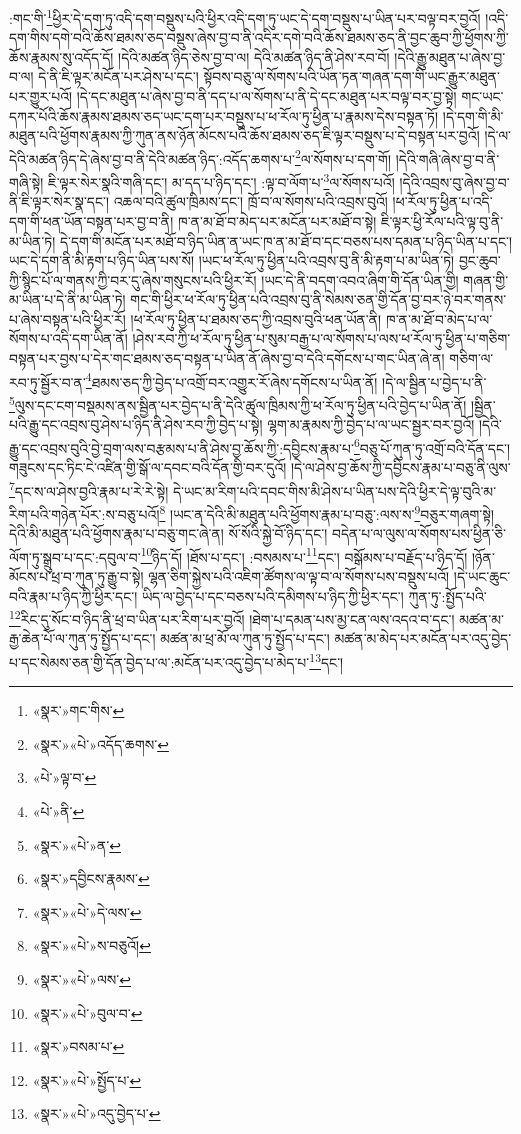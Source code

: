 :གང་གི་\footnote{«སྣར་»གང་གིས་}ཕྱིར་དེ་དག་ཏུ་འདི་དག་བསྡུས་པའི་ཕྱིར་འདི་དག་ཏུ་ཡང་དེ་དག་བསྡུས་པ་ཡིན་པར་བལྟ་བར་བྱའོ། །འདི་དག་གིས་དགེ་བའི་ཆོས་ཐམས་ཅད་བསྡུས་ཞེས་བྱ་བ་ནི་འདིར་དགེ་བའི་ཆོས་ཐམས་ཅད་ནི་བྱང་ཆུབ་ཀྱི་ཕྱོགས་ཀྱི་ཆོས་རྣམས་སུ་འདོད་དོ། །དེའི་མཚན་ཉིད་ཅེས་བྱ་བ་ལ། དེའི་མཚན་ཉིད་ནི་ཤེས་རབ་བོ། །དེའི་རྒྱུ་མཐུན་པ་ཞེས་བྱ་བ་ལ། དེ་ནི་ཇི་ལྟར་མངོན་པར་ཤེས་པ་དང་། སྟོབས་བཅུ་ལ་སོགས་པའི་ཡོན་ཏན་གཞན་དག་གི་ཡང་རྒྱུར་མཐུན་པར་གྱུར་པའོ། །དེ་དང་མཐུན་པ་ཞེས་བྱ་བ་ནི་དད་པ་ལ་སོགས་པ་ནི་དེ་དང་མཐུན་པར་བལྟ་བར་བྱ་སྟེ། གང་ཡང་དཀར་པོའི་ཆོས་རྣམས་ཐམས་ཅད་ཡང་དག་པར་བསྡུས་པ་ཕ་རོལ་ཏུ་ཕྱིན་པ་རྣམས་དེས་བསྟན་ཏོ། །དེ་དག་གི་མི་མཐུན་པའི་ཕྱོགས་རྣམས་ཀྱི་ཀུན་ནས་ཉོན་མོངས་པའི་ཆོས་ཐམས་ཅད་ཇི་ལྟར་བསྡུས་པ་དེ་བསྟན་པར་བྱའོ། །དེ་ལ་དེའི་མཚན་ཉིད་དེ་ཞེས་བྱ་བ་ནི་དེའི་མཚན་ཉིད་:འདོད་ཆགས་པ་\footnote{«སྣར་»«པེ་»འདོད་ཆགས་}ལ་སོགས་པ་དག་གོ། །དེའི་གཞི་ཞེས་བྱ་བ་ནི་གཞི་སྟེ། ཇི་ལྟར་སེར་སྣའི་གཞི་དང་། མ་དད་པ་ཉིད་དང་། :ལྟ་བ་ལོག་པ་\footnote{«པེ་»ལྟ་བ་}ལ་སོགས་པའོ། །དེའི་འབྲས་བུ་ཞེས་བྱ་བ་ནི་ཇི་ལྟར་སེར་སྣ་དང་། འཆལ་བའི་ཚུལ་ཁྲིམས་དང་། ཁྲོ་བ་ལ་སོགས་པའི་འབྲས་བུའོ། །ཕ་རོལ་ཏུ་ཕྱིན་པ་འདི་དག་གི་ཕན་ཡོན་བསྟན་པར་བྱ་བ་ནི། ཁ་ན་མ་ཐོ་བ་མེད་པར་མངོན་པར་མཐོ་བ་སྟེ། ཇི་ལྟར་ཕྱི་རོལ་པའི་ལྟ་བུ་ནི་མ་ཡིན་ཏེ། དེ་དག་གི་མངོན་པར་མཐོ་བ་ཉིད་ཡིན་ན་ཡང་ཁ་ན་མ་ཐོ་བ་དང་བཅས་པས་དམན་པ་ཉིད་ཡིན་པ་དང་། ཡང་དེ་དག་ནི་མི་རྟག་པ་ཉིད་ཡིན་པས་སོ། །ཡང་ཕ་རོལ་ཏུ་ཕྱིན་པའི་འབྲས་བུ་ནི་མི་རྟག་པ་མ་ཡིན་ཏེ། བྱང་ཆུབ་ཀྱི་སྙིང་པོ་ལ་གནས་ཀྱི་བར་དུ་ཞེས་གསུངས་པའི་ཕྱིར་རོ། །ཡང་དེ་ནི་བདག་འབའ་ཞིག་གི་དོན་ཡིན་གྱི། གཞན་གྱི་མ་ཡིན་པ་དེ་ནི་མ་ཡིན་ཏེ། གང་གི་ཕྱིར་ཕ་རོལ་ཏུ་ཕྱིན་པའི་འབྲས་བུ་ནི་སེམས་ཅན་གྱི་དོན་བྱ་བར་ཉེ་བར་གནས་པ་ཞེས་བསྟན་པའི་ཕྱིར་རོ། །ཕ་རོལ་ཏུ་ཕྱིན་པ་ཐམས་ཅད་ཀྱི་འབྲས་བུའི་ཕན་ཡོན་ནི། ཁ་ན་མ་ཐོ་བ་མེད་པ་ལ་སོགས་པ་འདི་དག་ཡིན་ནོ། །ཤེས་རབ་ཀྱི་ཕ་རོལ་ཏུ་ཕྱིན་པ་སུམ་བརྒྱ་པ་ལ་སོགས་པ་ལས་ཕ་རོལ་ཏུ་ཕྱིན་པ་གཅིག་བསྟན་པར་བྱས་པ་དེར་གང་ཐམས་ཅད་བསྟན་པ་ཡིན་ནོ་ཞེས་བྱ་བ་དེའི་དགོངས་པ་གང་ཡིན་ཞེ་ན། གཅིག་ལ་རབ་ཏུ་སྦྱོར་བ་ན་\footnote{«པེ་»ནི་}ཐམས་ཅད་ཀྱི་བྱེད་པ་འགྲོ་བར་འགྱུར་རོ་ཞེས་དགོངས་པ་ཡིན་ནོ། །དེ་ལ་སྦྱིན་པ་བྱེད་པ་ནི་\footnote{«སྣར་»«པེ་»ན་}ལུས་དང་ངག་བསྡམས་ནས་སྦྱིན་པར་བྱེད་པ་ནི་དེའི་ཚུལ་ཁྲིམས་ཀྱི་ཕ་རོལ་ཏུ་ཕྱིན་པའི་བྱེད་པ་ཡིན་ནོ། །སྦྱིན་པའི་རྒྱུ་དང་འབྲས་བུ་ཤེས་པ་ཉིད་ནི་ཤེས་རབ་ཀྱི་བྱེད་པ་སྟེ། ལྷག་མ་རྣམས་ཀྱི་བྱེད་པ་ལ་ཡང་སྦྱར་བར་བྱའོ། །དེའི་རྒྱུ་དང་འབྲས་བུའི་བྱེ་བྲག་ལས་བརྩམས་པ་ནི་ཤེས་བྱ་ཆོས་ཀྱི་:དབྱིངས་རྣམ་པ་\footnote{«སྣར་»དབྱིངས་རྣམས་}བཅུ་པོ་ཀུན་ཏུ་འགྲོ་བའི་དོན་དང་། གཟུངས་དང་ཏིང་ངེ་འཛིན་གྱི་སྒོ་ལ་དབང་བའི་དོན་གྱི་བར་དུའོ། །དེ་ལ་ཤེས་བྱ་ཆོས་ཀྱི་དབྱིངས་རྣམ་པ་བཅུ་ནི་ལུས་\footnote{«སྣར་»«པེ་»དེ་ལས་}དང་ས་ལ་ཤེས་བྱའི་རྣམ་པ་རེ་རེ་སྟེ། དེ་ཡང་མ་རིག་པའི་དབང་གིས་མི་ཤེས་པ་ཡིན་པས་དེའི་ཕྱིར་དེ་ལྟ་བུའི་མ་རིག་པའི་གཉེན་པོར་:ས་བཅུ་པའོ།\footnote{«སྣར་»«པེ་»ས་བཅུའོ།} །ཡང་ན་དེའི་མི་མཐུན་པའི་ཕྱོགས་རྣམ་པ་བཅུ་:ལས་ས་\footnote{«སྣར་»«པེ་»ལས་}བཅུར་གཞག་སྟེ། དེའི་མི་མཐུན་པའི་ཕྱོགས་རྣམ་པ་བཅུ་གང་ཞེ་ན། སོ་སོའི་སྐྱེ་བོ་ཉིད་དང་། བདེན་པ་ལ་ལུས་ལ་སོགས་པས་ཕྱིན་ཅི་ལོག་ཏུ་སྒྲུབ་པ་དང་:དབུལ་བ་\footnote{«སྣར་»«པེ་»བུལ་བ་}ཉིད་དོ། །ཐོས་པ་དང་། :བསམས་པ་\footnote{«སྣར་»བསམ་པ་}དང་། བསྒོམས་པ་བརྗོད་པ་ཉིད་དོ། །ཉོན་མོངས་པ་ཕྲ་བ་ཀུན་ཏུ་རྒྱུ་བ་སྟེ། ལྷན་ཅིག་སྐྱེས་པའི་འཇིག་ཚོགས་ལ་ལྟ་བ་ལ་སོགས་པས་བསྡུས་པའོ། །དེ་ཡང་ཆུང་བའི་རྣམ་པ་ཉིད་ཀྱི་ཕྱིར་དང་། ཡིད་ལ་བྱེད་པ་དང་བཅས་པའི་དམིགས་པ་ཉིད་ཀྱི་ཕྱིར་དང་། ཀུན་ཏུ་:སྤྱོད་པའི་\footnote{«སྣར་»«པེ་»སྤྱོད་པ་}རིང་དུ་སོང་བ་ཉིད་ནི་ཕྲ་བ་ཡིན་པར་རིག་པར་བྱའོ། །ཐེག་པ་དམན་པས་མྱ་ངན་ལས་འདའ་བ་དང་། མཚན་མ་རྒྱ་ཆེན་པོ་ལ་ཀུན་ཏུ་སྤྱོད་པ་དང་། མཚན་མ་ཕྲ་མོ་ལ་ཀུན་ཏུ་སྤྱོད་པ་དང་། མཚན་མ་མེད་པར་མངོན་པར་འདུ་བྱེད་པ་དང་སེམས་ཅན་གྱི་དོན་བྱེད་པ་ལ་:མངོན་པར་འདུ་བྱེད་པ་མེད་པ་\footnote{«སྣར་»«པེ་»འདུ་བྱེད་པ་}དང་། 